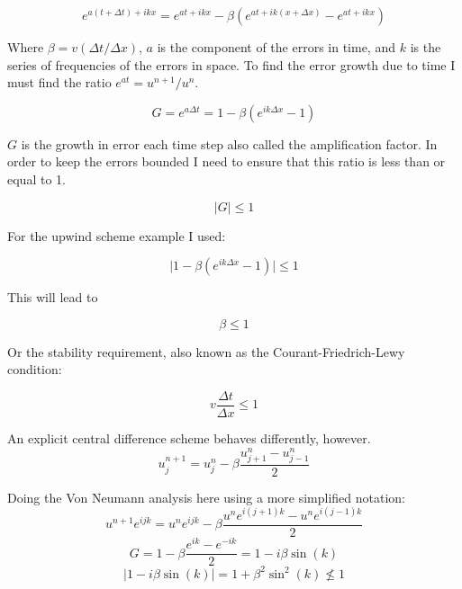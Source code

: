\documentclass[12pt,upcase]{umlthesis}
\begin{document}
\begin{equation}
	e^{a(t+\Delta t)+ikx} = e^{at+ikx} - \beta (e^{at + ik(x+\Delta x)}-e^{at + ikx})
\end{equation}

Where $\beta = v(\Delta t / \Delta x)$, $a$ is the component of the errors in time, and $k$ is the series of frequencies of the errors in space. To find the error growth due to time I must find the ratio $e^{at} = u^{n+1}/u^n$.

\begin{equation}
	G = e^{a\Delta t} = 1 - \beta (e^{ik\Delta x}- 1)
\end{equation}

$G$ is the growth in error each time step also called the amplification factor. In order to keep the errors bounded I need to ensure that this ratio is less than or equal to 1.

\begin{equation}
	\lvert G \rvert \leq 1
\end{equation}

For the upwind scheme example I used: 

\begin{equation}
	\lvert 1 - \beta (e^{ik\Delta x}- 1) \rvert \leq 1
\end{equation}

This will lead to

\begin{equation}
	\beta \leq 1
\end{equation}

Or the stability requirement, also known as the Courant-Friedrich-Lewy condition:

\begin{equation}
	v \frac{\Delta t}{\Delta x} \leq 1
\end{equation}

An explicit central difference scheme behaves differently, however.
\begin{equation}\label{eq:central}
	u^{n+1}_j = u^n_j - \beta \frac{u^n_{j+1}-u^n_{j-1}}{2}
\end{equation}

Doing the Von Neumann analysis here using a more simplified notation:
\begin{equation}
	u^{n+1} e^{ijk} = u^n e^{ijk} - \beta \frac{u^n e^{i(j+1)k} - u^n e^{i(j-1)k}}{2}
\end{equation}
\begin{equation}
	G = 1 - \beta \frac{e^{ik} - e^{-ik}}{2} = 1 - i\beta \sin{(k)}
\end{equation}
\begin{equation}
	\lvert 1 - i\beta \sin{(k)} \rvert = 1 + \beta^2 \sin^2(k) \nleq 1
\end{equation}
\end{document}
